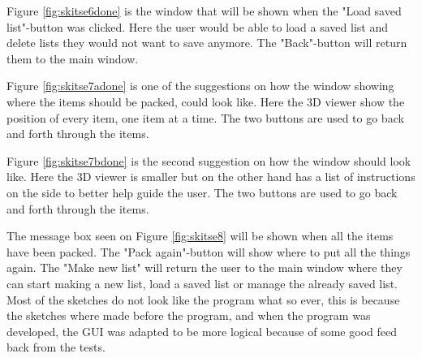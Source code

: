 Figure \ref{fig:skitse6done} is the window that will be shown when the "Load saved list"-button was clicked. Here the user would be able to load a saved list and delete lists they would not want to save anymore. The "Back"-button will return them to the main window.


Figure \ref{fig:skitse7adone} is one of the suggestions on how the window showing where the items should be packed, could look like. Here the 3D viewer show the position of every item, one item at a time. The two buttons are used to go back and forth through the items.


Figure \ref{fig:skitse7bdone} is the second suggestion on how the window should look like. Here the 3D viewer is smaller but on the other hand has a list of instructions on the side to better help guide the user. The two buttons are used to go back and forth through the items.


The message box seen on Figure \ref{fig:skitse8} will be shown when all the items have been packed. The "Pack again"-button will show where to put all the things again. The "Make new list" will return the user to the main window where they can start making a new list, load a saved list or manage the already saved list. Most of the sketches do not look like the program what so ever, this is because the sketches where made before the program, and when the program was developed, the GUI was adapted to be more logical because of some good feed back from the tests.
